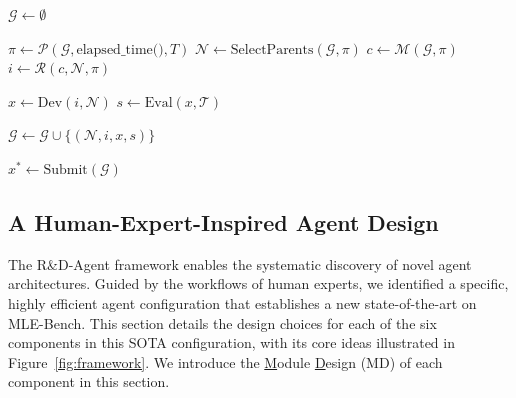 \begin{algorithm}[H]
\SetAlgoLined
\DontPrintSemicolon
{}

\BlankLine

$\mathcal{G} \gets \emptyset$ 

{
 \BlankLine
 
  $\pi \gets \mathcal{P}(\mathcal{G}, \text{elapsed\_time()}, T)$ 
  $\mathcal{N} \gets \text{SelectParents}(\mathcal{G}, \pi)$ 
  $c \gets \mathcal{M}(\mathcal{G}, \pi)$ 
  $i \gets \mathcal{R}(c, \mathcal{N}, \pi)$ 
  \BlankLine
  
  $x \gets \text{Dev}(i, \mathcal{N})$ 
  $s \gets \text{Eval}(x, \mathcal{T})$ 
  \BlankLine
  
  $\mathcal{G} \gets \mathcal{G} \cup \{(\mathcal{N}, i, x, s)\}$ 
}

$x^* \gets \text{Submit}(\mathcal{G})$ 

\caption{High-Level Algorithm of the R\&D-Agent Framework}
\label{alg:rd_agent_framework}
\end{algorithm}



\subsection{A Human-Expert-Inspired Agent Design}
\label{sec:method-design}
The R\&D-Agent framework enables the systematic discovery of novel agent architectures. Guided by the workflows of human experts, we identified a specific, highly efficient agent configuration that establishes a new state-of-the-art on MLE-Bench. This section details the design choices for each of the six components in this SOTA configuration, with its core ideas illustrated in Figure~\ref{fig:framework}. We introduce the \uline{M}odule \uline{D}esign (MD) of each component in this section.

